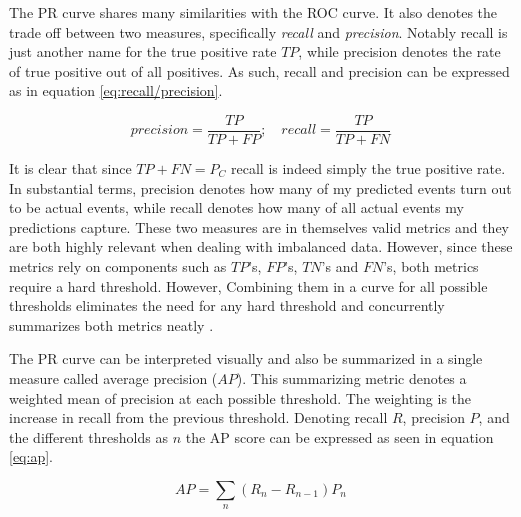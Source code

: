 \documentclass[a4paper]{article}
\begin{document}
The PR curve shares many similarities with the ROC curve. It also denotes the trade off between two measures, specifically \emph{recall} and \emph{precision}. Notably recall is just another name for the true positive rate $TP$, while precision denotes the rate of true positive out of all positives. As such, recall and
precision can be expressed as in equation \ref{eq:recall/precision}.\par%

\[
precision = \frac{TP}{TP+FP}; \quad recall = \frac{TP}{TP+FN} \tag{16} \label{eq:recall/precision}
\]


It is clear that since $TP+FN = P_C$ recall is indeed simply the true positive rate. In substantial terms, precision denotes how many of my predicted events turn out to be actual events, while recall denotes how many of all actual events my predictions capture. These two measures are in themselves valid metrics and they are both highly relevant when dealing with imbalanced data. However, since these metrics rely on components such as $TP$'s, $FP$'s, $TN$'s and $FN$'s, both metrics require a hard threshold. However, Combining them in a curve for all possible thresholds eliminates the need for any hard threshold and concurrently summarizes both metrics neatly \citep[1287]{He_2008}.\par

The PR curve can be interpreted visually and also be summarized in a single measure called average precision ($AP$). This summarizing metric denotes a weighted mean of precision at each possible threshold. The weighting is the increase in recall from the previous threshold. Denoting recall $R$, precision $P$, and the different thresholds as $n$ the AP score can be expressed as seen in equation \ref{eq:ap}.\par

\[
AP = \sum_n (R_n-R_{n-1})P_n \tag{17} \label{eq:ap}
\]
\end{document}
